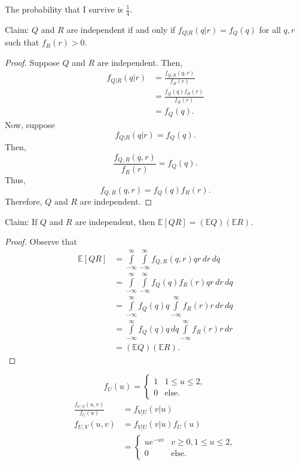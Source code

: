 \documentclass[12pt]{article}
\begin{document}
The probability that I survive is $\frac14$.

\newpage
{}

\medskip
{} Claim: $Q$ and $R$ are independent if and only if $f_{Q|R}(q|r) = f_Q(q)$ for all $q,r$ such that $f_R(r) > 0$.
\begin{proof}
    Suppose $Q$ and $R$ are independent. Then,
    \begin{align*}
        f_{Q|R}(q|r) &= \frac{f_{Q,R}(q,r)}{f_R(r)} \\
                     &= \frac{f_Q(q)f_R(r)}{f_R(r)} \\
                     &= f_Q(q).
    \end{align*}
    Now, suppose $$f_{Q|R}(q|r) = f_Q(q).$$ Then, $$\frac{f_{Q,R}(q,r)}{f_R(r)} = f_Q(q).$$ Thus, $$f_{Q,R}(q,r) = f_Q(q)f_R(r).$$ Therefore, $Q$ and $R$ are independent.
\end{proof}

\medskip
{} Claim: If $Q$ and $R$ are independent, then $\mathbb E[QR] = (\mathbb EQ)(\mathbb ER)$.
\begin{proof}
    Observe that
    \begin{align*}
        \mathbb E[QR] &= \int\limits_{-\infty}^\infty \int\limits_{-\infty}^\infty f_{Q,R}(q,r) qr\,dr\,dq \\
                      &= \int\limits_{-\infty}^\infty \int\limits_{-\infty}^\infty f_Q(q)f_R(r) qr\,dr\,dq \\
                      &= \int\limits_{-\infty}^\infty f_Q(q)q \int\limits_{-\infty}^\infty f_R(r) r\,dr\,dq \\
                      &= \int\limits_{-\infty}^\infty f_Q(q)q \,dq\int\limits_{-\infty}^\infty f_R(r) r\,dr \\
                      &= (\mathbb EQ)(\mathbb ER).
    \end{align*}
\end{proof}

\newpage
{}

\medskip
{}
$$f_U(u) = \begin{cases} 1 & 1 \leq u \leq 2, \\ 0 & \text{else.} \end{cases}$$ 
\begin{align*}
    \frac{f_{U,V}(u,v)}{f_U(u)} &= f_{V|U}(v|u) \\
    f_{U,V}(u,v) &= f_{V|U}(v|u)f_U(u) \\
                 &= \begin{cases} ue^{-uv} & v \geq 0, 1 \leq u \leq 2, \\
                                  0 & \text{else.}
                    \end{cases}
\end{align*}
\end{document}
